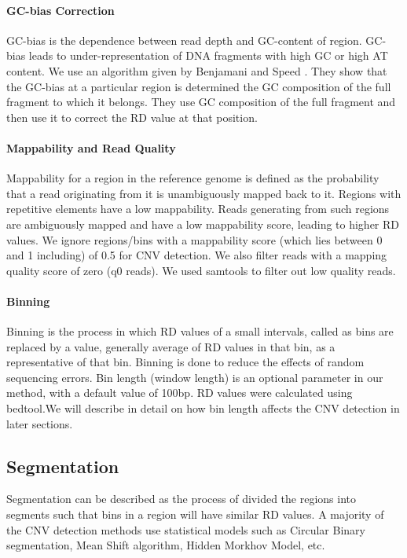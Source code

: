 \documentclass[twocolumn,oneside,conference]
{IEEEtran}
\begin{document}
\paragraph*{GC-bias Correction}
GC-bias is the dependence between read depth and GC-content of region. GC-bias leads to under-representation of DNA fragments with high GC or high AT content. We use an algorithm given by Benjamani and Speed \cite{17}. They show that the GC-bias at a particular region is determined the GC composition of the full fragment to which it belongs. They use GC composition of the full fragment and then use it to correct the RD value at that position.

\paragraph*{Mappability and Read Quality}
Mappability for a region in the reference genome is defined
as the probability that a read originating from it is unambiguously mapped back to it. Regions with repetitive elements have a low mappability. Reads generating from such regions are ambiguously mapped and have a low mappability score, leading to higher RD values. We ignore regions/bins with a mappability score (which lies between 0 and 1 including) of 0.5 for CNV detection. We also filter reads with a mapping quality score of zero (q0 reads). We used samtools to filter out low quality reads.

\paragraph*{Binning}
Binning is the process in which RD values of a small intervals, called as bins are replaced by a value, generally average of RD values in that bin, as a representative of that bin. Binning is done to reduce the effects of random sequencing errors. Bin length (window length) is an optional parameter in our method, with a default value of 100bp. RD values were calculated using bedtool.We will describe in detail on how bin length affects the CNV detection in later sections.         


\subsection{Segmentation}
Segmentation can be described as the process of divided the regions into segments such that bins in a region will have similar RD values. A majority of the CNV detection methods use statistical models such as Circular Binary segmentation, Mean Shift algorithm, Hidden Morkhov Model, etc. 
\end{document}

